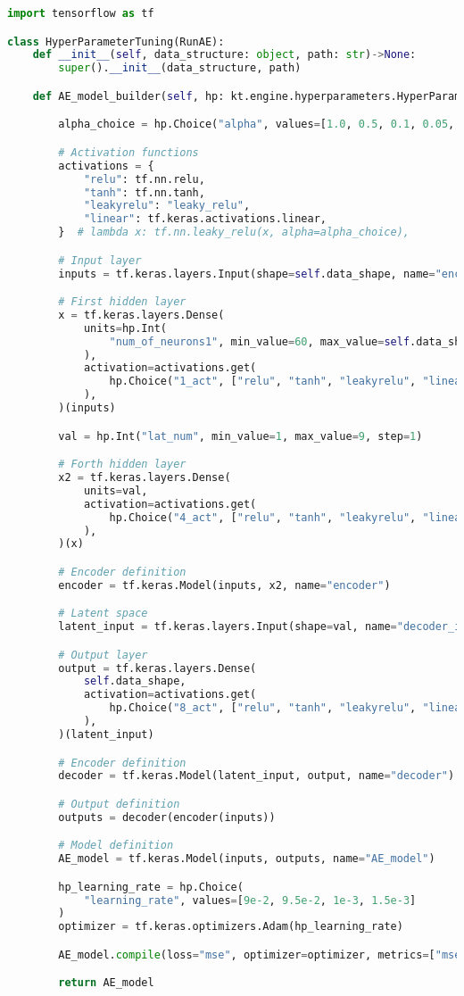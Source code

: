 \begin{lstlisting}[language=Python, style=pythonstyle, label={code:ae_code_arch}]
import tensorflow as tf

class HyperParameterTuning(RunAE):
    def __init__(self, data_structure: object, path: str)->None:
        super().__init__(data_structure, path)

    def AE_model_builder(self, hp: kt.engine.hyperparameters.HyperParameters):

        alpha_choice = hp.Choice("alpha", values=[1.0, 0.5, 0.1, 0.05, 0.01])

        # Activation functions
        activations = {
            "relu": tf.nn.relu,
            "tanh": tf.nn.tanh,
            "leakyrelu": "leaky_relu",
            "linear": tf.keras.activations.linear,
        }  # lambda x: tf.nn.leaky_relu(x, alpha=alpha_choice),

        # Input layer
        inputs = tf.keras.layers.Input(shape=self.data_shape, name="encoder_input")

        # First hidden layer
        x = tf.keras.layers.Dense(
            units=hp.Int(
                "num_of_neurons1", min_value=60, max_value=self.data_shape - 1, step=1
            ),
            activation=activations.get(
                hp.Choice("1_act", ["relu", "tanh", "leakyrelu", "linear"])
            ),
        )(inputs)

        val = hp.Int("lat_num", min_value=1, max_value=9, step=1)

        # Forth hidden layer
        x2 = tf.keras.layers.Dense(
            units=val,
            activation=activations.get(
                hp.Choice("4_act", ["relu", "tanh", "leakyrelu", "linear"])
            ),
        )(x)

        # Encoder definition
        encoder = tf.keras.Model(inputs, x2, name="encoder")

        # Latent space
        latent_input = tf.keras.layers.Input(shape=val, name="decoder_input")

        # Output layer
        output = tf.keras.layers.Dense(
            self.data_shape,
            activation=activations.get(
                hp.Choice("8_act", ["relu", "tanh", "leakyrelu", "linear"])
            ),
        )(latent_input)

        # Encoder definition
        decoder = tf.keras.Model(latent_input, output, name="decoder")

        # Output definition
        outputs = decoder(encoder(inputs))

        # Model definition
        AE_model = tf.keras.Model(inputs, outputs, name="AE_model")

        hp_learning_rate = hp.Choice(
            "learning_rate", values=[9e-2, 9.5e-2, 1e-3, 1.5e-3]
        )
        optimizer = tf.keras.optimizers.Adam(hp_learning_rate)

        AE_model.compile(loss="mse", optimizer=optimizer, metrics=["mse"])

        return AE_model
    \end{lstlisting}

